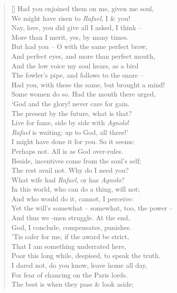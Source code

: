 \documentclass[MAIN]{subfiles}
\begin{document}
\begin{verse}[\versewidth]
Had you enjoined them on me, given me soul,\\
We might have risen to \emph{Rafael}, I \& you!\\ 
Nay, love, you did give all I asked, I think --\\
More than I merit, yes, by many times.\\
But had you -- O with the same perfect brow,\\
And perfect eyes, and more than perfect mouth,\\
And the low voice my soul hears, as a bird\\
The fowler's pipe, and follows to the snare --\\
Had you, with these the same, but brought a mind!\\
Some women do so. Had the mouth there urged,\\
`God and the glory! never care for gain.\\
The present by the future, what is that?\\
Live for fame, side by side with \emph{Agnolo}!\\
\emph{Rafael} is waiting: up to God, all three!'\\ 
I might have done it for you. So it seems:\\
Perhaps not. All is as God over-rules.\\
Beside, incentives come from the soul's self;\\
The rest avail not. Why do I need you?\\
What wife had \emph{Rafael}, or has \emph{Agnolo}?\\
In this world, who can do a thing, will not;\\
And who would do it, cannot, I perceive:\\
Yet the will's somewhat -- somewhat, too, the power --\\
And thus we -men struggle. At the end,\\
God, I conclude, compensates, punishes.\\
'Tis safer for me, if the award be strict,\\
That I am something underrated here,\\
Poor this long while, despised, to speak the truth.\\
I dared not, do you know, leave home all day,\\
For fear of chancing on the {\sc Paris} lords.\\
The best is when they pass \& look aside;\\

\end{verse}
\end{document}
